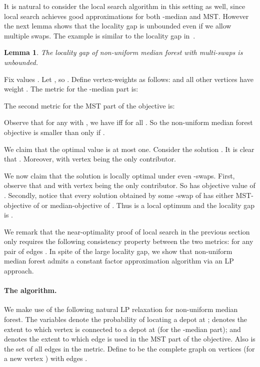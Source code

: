 \documentclass[11pt,twoside,a4paper]{article}
\newtheorem{lemma}[theorem]{Lemma}
\newenvironment{proof}{

\noindent{\bf Proof:}} {\hfill


}
\def\kmf{ median forest\xspace}
\begin{document}
It is natural to consider the local search algorithm in this setting as well, since local search achieves good
approximations for both -median and MST. However the next lemma shows that the locality gap is unbounded even if we
allow multiple swaps. The example is similar to the locality gap in~\cite{KKNSS11}.
\begin{lemma}
The locality gap of non-uniform \kmf with multi-swaps is unbounded.
\end{lemma}
\begin{proof}
Fix values . Let , so . Define vertex-weights
as follows:  and all other vertices have weight . The metric  for the -median part is:

The second metric  for the MST part of the objective is:

Observe that for any  with , we have  iff  for all
. So the non-uniform \kmf objective is smaller than  only if .

We claim that the optimal value is at most one. Consider the solution . It is clear that
. Moreover,  with vertex  being the only contributor.

We now claim that the solution  is locally optimal under even -swaps. First, observe that
 and  with vertex  being the only contributor. So  has
objective value of . Secondly, notice that every solution  obtained by some -swap of  has either
MST-objective of  or median-objective of . Thus  is a local optimum and the locality gap is .
\end{proof}

\medskip

We remark that the near-optimality proof of local search in the previous section only requires the following
consistency property between the two metrics: for any pair  of edges . In spite of
the large locality gap, we show that non-uniform \kmf admits a constant factor approximation algorithm via an LP
approach.

\def\spp{\mathbb{SP}}
\newcommand{\pri}{{\mathcal{P}}}
\newcommand{\lpo}{\ensuremath{\mathsf{LP_{med}}\xspace}}
\newcommand{\LP}{\ensuremath{\mathsf{LP}\xspace}}
\newcommand{\I}{\ensuremath{{\mathcal{I}}}\xspace}
\newcommand{\J}{\ensuremath{{\mathcal{M}}}\xspace}

\paragraph{The algorithm.} We make use of the following natural LP relaxation for non-uniform \kmf. The variables  denote the probability
of locating a depot at ;  denotes the extent to which vertex  is connected to a depot at  (for the
-median part); and  denotes the extent to which edge  is used in the MST part of the objective. Also
 is the set of all edges in the metric. Define  to be the complete graph on vertices 
(for a new vertex ) with edges .
\end{document}

